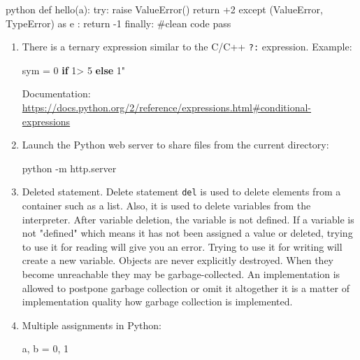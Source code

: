 \documentclass[
]{article}
\newenvironment{Shaded}{}{}
\newcommand{\AttributeTok}[1]{\textcolor[rgb]{0.49,0.56,0.16}{#1}}
\newcommand{\ControlFlowTok}[1]{\textcolor[rgb]{0.00,0.44,0.13}{\textbf{#1}}}
\newcommand{\DecValTok}[1]{\textcolor[rgb]{0.25,0.63,0.44}{#1}}
\newcommand{\ExtensionTok}[1]{#1}
\newcommand{\NormalTok}[1]{#1}
\newcommand{\OperatorTok}[1]{\textcolor[rgb]{0.40,0.40,0.40}{#1}}
\newcommand{\StringTok}[1]{\textcolor[rgb]{0.25,0.44,0.63}{#1}}
\begin{document}
\begin{Shaded}
\begin{Highlighting}[]
\NormalTok{\textasciigrave{}\textasciigrave{}\textasciigrave{}python}
\NormalTok{def hello(a): 	}
\NormalTok{  try:  		}
\NormalTok{    raise ValueError() }
\NormalTok{    return +2  	}
\NormalTok{  except (ValueError, TypeError)  as e :    		}
\NormalTok{    return {-}1 	}
\NormalTok{  finally:  		}
\NormalTok{    \#clean code  		}
\NormalTok{    pass}
\NormalTok{\textasciigrave{}\textasciigrave{}\textasciigrave{}}
\end{Highlighting}
\end{Shaded}

\begin{enumerate}
\def\labelenumi{\arabic{enumi}.}
\item
  There is a ternary expression similar to the C/C++ \texttt{?:}
  expression. Example:

\begin{Shaded}
\begin{Highlighting}[]
\NormalTok{sym }\OperatorTok{=} \StringTok{\textquotesingle{}0\textquotesingle{}} \ControlFlowTok{if} \DecValTok{1}\OperatorTok{\textgreater{}} \DecValTok{5} \ControlFlowTok{else} \StringTok{\textquotesingle{}\textquotesingle{}}\DecValTok{1}\StringTok{" }
\end{Highlighting}
\end{Shaded}

  Documentation:
  \url{https://docs.python.org/2/reference/expressions.html\#conditional-expressions}
\item
  Launch the Python web server to share files from the current
  directory:

\begin{Shaded}
\begin{Highlighting}[]
\ExtensionTok{python} \AttributeTok{{-}m}\NormalTok{ http.server}
\end{Highlighting}
\end{Shaded}
\item
  Deleted statement. Delete statement \texttt{del} is used to delete
  elements from a container such as a list. Also, it is used to delete
  variables from the interpreter. After variable deletion, the variable
  is not defined. If a variable is not "defined" which means it has not
  been assigned a value or deleted, trying to use it for reading will
  give you an error. Trying to use it for writing will create a new
  variable. Objects are never explicitly destroyed. When they become
  unreachable they may be garbage-collected. An implementation is
  allowed to postpone garbage collection or omit it altogether it is a
  matter of implementation quality how garbage collection is
  implemented.
\item
  Multiple assignments in Python:

\begin{Shaded}
\begin{Highlighting}[]
\NormalTok{a, b }\OperatorTok{=} \DecValTok{0}\NormalTok{, }\DecValTok{1}
\end{Highlighting}
\end{Shaded}
\end{enumerate}
\end{document}

